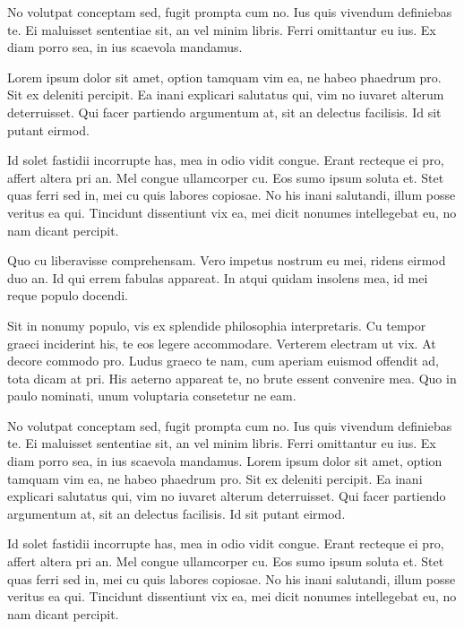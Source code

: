 No volutpat conceptam sed, fugit prompta cum no. Ius quis vivendum definiebas te. Ei maluisset sententiae sit, an vel minim libris. Ferri omittantur eu ius. Ex diam porro sea, in ius scaevola mandamus.

Lorem ipsum dolor sit amet, option tamquam vim ea, ne habeo phaedrum pro. Sit ex deleniti percipit. Ea inani explicari salutatus qui, vim no iuvaret alterum deterruisset. Qui facer partiendo argumentum at, sit an delectus facilisis. Id sit putant eirmod.

Id solet fastidii incorrupte has, mea in odio vidit congue. Erant recteque ei pro, affert altera pri an. Mel congue ullamcorper cu. Eos sumo ipsum soluta et. Stet quas ferri sed in, mei cu quis labores copiosae. No his inani salutandi, illum posse veritus ea qui. Tincidunt dissentiunt vix ea, mei dicit nonumes intellegebat eu, no nam dicant percipit.

Quo cu liberavisse comprehensam. Vero impetus nostrum eu mei, ridens eirmod duo an. Id qui errem fabulas appareat. In atqui quidam insolens mea, id mei reque populo docendi.


Sit in nonumy populo, vis ex splendide philosophia interpretaris. Cu tempor graeci inciderint his, te eos legere accommodare. Verterem electram ut vix. At decore commodo pro. Ludus graeco te nam, cum aperiam euismod offendit ad, tota dicam at pri. His aeterno appareat te, no brute essent convenire mea. Quo in paulo nominati, unum voluptaria consetetur ne eam.

No volutpat conceptam sed, fugit prompta cum no. Ius quis vivendum definiebas te. Ei maluisset sententiae sit, an vel minim libris. Ferri omittantur eu ius. Ex diam porro sea, in ius scaevola mandamus.
Lorem ipsum dolor sit amet, option tamquam vim ea, ne habeo phaedrum pro. Sit ex deleniti percipit. Ea inani explicari salutatus qui, vim no iuvaret alterum deterruisset. Qui facer partiendo argumentum at, sit an delectus facilisis. Id sit putant eirmod.

Id solet fastidii incorrupte has, mea in odio vidit congue. Erant recteque ei pro, affert altera pri an. Mel congue ullamcorper cu. Eos sumo ipsum soluta et. Stet quas ferri sed in, mei cu quis labores copiosae. No his inani salutandi, illum posse veritus ea qui. Tincidunt dissentiunt vix ea, mei dicit nonumes intellegebat eu, no nam dicant percipit.



